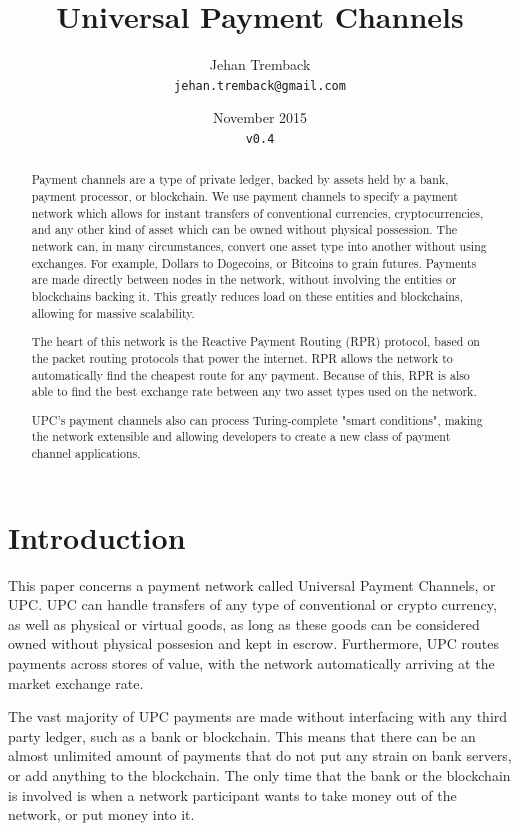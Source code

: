 \documentclass[a4paper]{article}
\title{Universal Payment Channels}
\author{Jehan Tremback\\
\texttt{jehan.tremback@gmail.com}\\}
\date{November 2015\\
\texttt{v0.4}}
\begin{document}
\maketitle

\begin{abstract}
Payment channels are a type of private ledger, backed by assets held by a bank, payment processor, or blockchain. We use payment channels to specify a payment network which allows for instant transfers of conventional currencies, cryptocurrencies, and any other kind of asset which can be owned without physical possession. The network can, in many circumstances, convert one asset type into another without using exchanges. For example, Dollars to Dogecoins, or Bitcoins to grain futures. Payments are made directly between nodes in the network, without involving the entities or blockchains backing it. This greatly reduces load on these entities and blockchains, allowing for massive scalability.

The heart of this network is the Reactive Payment Routing (RPR) protocol, based on the packet routing protocols that power the internet. RPR allows the network to automatically find the cheapest route for any payment. Because of this, RPR is also able to find the best exchange rate between any two asset types used on the network.

UPC's payment channels also can process Turing-complete "smart conditions", making the network extensible and allowing developers to create a new class of payment channel applications.
\end{abstract}

\section*{Introduction}

This paper concerns a payment network called Universal Payment Channels, or UPC. UPC can handle transfers of any type of conventional or crypto currency, as well as physical or virtual goods, as long as these goods can be considered owned without physical possesion and kept in escrow. Furthermore, UPC routes payments across stores of value, with the network automatically arriving at the market exchange rate.

The vast majority of UPC payments are made without interfacing with any third party ledger, such as a bank or blockchain. This means that there can be an almost unlimited amount of payments that do not put any strain on bank servers, or add anything to the blockchain. The only time that the bank or the blockchain is involved is when a network participant wants to take money out of the network, or put money into it.
\end{document}
